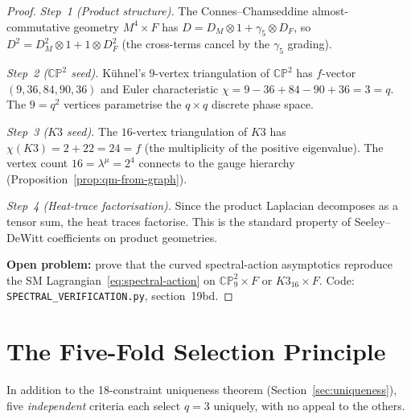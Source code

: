 \documentclass[12pt,a4paper]{article}
\begin{document}
\begin{proof}
\emph{Step~1 (Product structure).}
The Connes--Chamseddine almost-commutative geometry
$M^4 \times F$ has $D = D_M \otimes 1 + \gamma_5 \otimes D_F$,
so $D^2 = D_M^2 \otimes 1 + 1 \otimes D_F^2$ (the cross-terms
cancel by the $\gamma_5$ grading).

\emph{Step~2 ($\mathbb{CP}^2$ seed).}
K\"uhnel's $9$-vertex triangulation of $\mathbb{CP}^2$ has
$f$-vector $(9, 36, 84, 90, 36)$ and Euler characteristic
$\chi = 9 - 36 + 84 - 90 + 36 = 3 = q$.
The $9 = q^2$ vertices parametrise the $q \times q$ discrete
phase space.

\emph{Step~3 ($K3$ seed).}
The $16$-vertex triangulation of $K3$ has
$\chi(K3) = 2 + 22 = 24 = f$ (the multiplicity of the
positive eigenvalue).  The vertex count $16 = \lambda^\mu = 2^4$
connects to the gauge hierarchy
(Proposition~\ref{prop:qm-from-graph}).

\emph{Step~4 (Heat-trace factorisation).}
Since the product Laplacian decomposes as a tensor sum,
the heat traces factorise.
This is the standard property of Seeley--DeWitt coefficients
on product geometries.

\textbf{Open problem:} prove that the curved spectral-action
asymptotics reproduce the SM Lagrangian~\eqref{eq:spectral-action}
on $\mathbb{CP}^2_9 \times F$ or $K3_{16} \times F$.
Code: \texttt{SPECTRAL\_VERIFICATION.py}, section~19bd.
\end{proof}

\section{The Five-Fold Selection Principle}
\label{sec:five-selectors}

In addition to the 18-constraint uniqueness theorem
(Section~\ref{sec:uniqueness}), five \emph{independent} criteria
each select $q = 3$ uniquely, with no appeal to the others.
\end{document}
